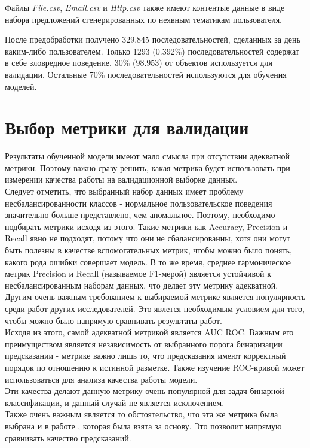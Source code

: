 Файлы \textit{File.csv}, \textit{Email.csv} и \textit{Http.csv} также имеют контентые данные  в виде набора предложений сгенерированных  по неявным тематикам пользователя.

После предобработки получено 329.845 последовательностей, сделанных за день каким-либо пользователем. Только 1293 (0.392\%) последовательностей содержат в себе зловредное поведение. 30\% (98.953) от объектов используется для валидации. Остальные 70\% последовательностей используются для обучения моделей.

\section{Выбор метрики для валидации}
Результаты обученной модели имеют мало смысла при отсутствии адекватной метрики. Поэтому важно сразу решить, какая метрика будет использовать при измерении качества работы на валидационной выборке данных.\\
Следует отметить, что выбранный набор данных имеет проблему несбалансированности классов - нормальное пользовательское поведения значительно больше представлено, чем аномальное. Поэтому, необходимо подбирать метрики исходя из этого. Такие метрики как Accuracy, Precision и Recall явно не подходят, потому что они не сбалансированны, хотя они могут быть полезны в качестве вспомогательных метрик, чтобы можно было понять, какого рода ошибки совершает модель. В то же время, среднее гармоническое метрик Precision и Recall (называемое F1-мерой) является устойчивой к несбалансированным наборам данных, что делает эту метрику адекватной.\\
Другим очень важным требованием к выбираемой метрике является популярность среди работ других исследователей. Это явлется необходимым условием для того, чтобы можно было напрямую сравнивать результаты работ.\\
Исходя из этого, самой адекватной метрикой является AUC ROC. Важным его преимуществом является независимость от выбранного порога бинаризации предсказании - метрике важно лишь то, что предсказания имеют корректный порядок по отношению к истинной разметке. Также изучение ROC-кривой может использоваться для анализа качества работы модели.\\
Эти качества делают данную метрику очень популярной для задач бинарной классификации, и данный случай не является исключением.\\
Также очень важным является то обстоятельство, что эта же метрика была выбрана и в работе \cite{yuanInsiderThreatDetection2018b}, которая была взята за основу. Это позволит напрямую сравнивать качество предсказаний.

